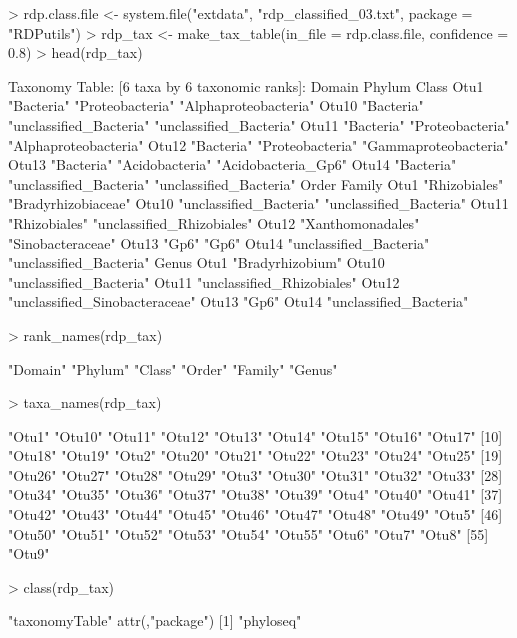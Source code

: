 \documentclass{article}
\begin{document}
\begin{Schunk}
\begin{Sinput}
> rdp.class.file <- system.file("extdata", "rdp_classified_03.txt", package = "RDPutils")
> rdp_tax <- make_tax_table(in_file = rdp.class.file, confidence = 0.8)
> head(rdp_tax)
\end{Sinput}
\begin{Soutput}
Taxonomy Table:     [6 taxa by 6 taxonomic ranks]:
      Domain     Phylum                  Class                  
Otu1  "Bacteria" "Proteobacteria"        "Alphaproteobacteria"  
Otu10 "Bacteria" "unclassified_Bacteria" "unclassified_Bacteria"
Otu11 "Bacteria" "Proteobacteria"        "Alphaproteobacteria"  
Otu12 "Bacteria" "Proteobacteria"        "Gammaproteobacteria"  
Otu13 "Bacteria" "Acidobacteria"         "Acidobacteria_Gp6"    
Otu14 "Bacteria" "unclassified_Bacteria" "unclassified_Bacteria"
      Order                   Family                    
Otu1  "Rhizobiales"           "Bradyrhizobiaceae"       
Otu10 "unclassified_Bacteria" "unclassified_Bacteria"   
Otu11 "Rhizobiales"           "unclassified_Rhizobiales"
Otu12 "Xanthomonadales"       "Sinobacteraceae"         
Otu13 "Gp6"                   "Gp6"                     
Otu14 "unclassified_Bacteria" "unclassified_Bacteria"   
      Genus                         
Otu1  "Bradyrhizobium"              
Otu10 "unclassified_Bacteria"       
Otu11 "unclassified_Rhizobiales"    
Otu12 "unclassified_Sinobacteraceae"
Otu13 "Gp6"                         
Otu14 "unclassified_Bacteria"       
\end{Soutput}
\begin{Sinput}
> rank_names(rdp_tax)
\end{Sinput}
\begin{Soutput}
[1] "Domain" "Phylum" "Class"  "Order"  "Family" "Genus" 
\end{Soutput}
\begin{Sinput}
> taxa_names(rdp_tax)
\end{Sinput}
\begin{Soutput}
 [1] "Otu1"  "Otu10" "Otu11" "Otu12" "Otu13" "Otu14" "Otu15" "Otu16" "Otu17"
[10] "Otu18" "Otu19" "Otu2"  "Otu20" "Otu21" "Otu22" "Otu23" "Otu24" "Otu25"
[19] "Otu26" "Otu27" "Otu28" "Otu29" "Otu3"  "Otu30" "Otu31" "Otu32" "Otu33"
[28] "Otu34" "Otu35" "Otu36" "Otu37" "Otu38" "Otu39" "Otu4"  "Otu40" "Otu41"
[37] "Otu42" "Otu43" "Otu44" "Otu45" "Otu46" "Otu47" "Otu48" "Otu49" "Otu5" 
[46] "Otu50" "Otu51" "Otu52" "Otu53" "Otu54" "Otu55" "Otu6"  "Otu7"  "Otu8" 
[55] "Otu9" 
\end{Soutput}
\begin{Sinput}
> class(rdp_tax)
\end{Sinput}
\begin{Soutput}
[1] "taxonomyTable"
attr(,"package")
[1] "phyloseq"
\end{Soutput}
\end{Schunk}
\end{document}
